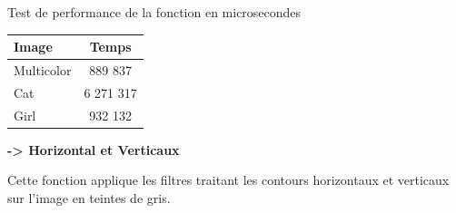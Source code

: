 \documentclass{article}
\begin{document}
\begin{center}
\medbreak
Test de performance de la fonction en microsecondes
\bigbreak
   \begin{tabular}{ | l | c | }
     \hline
     Image & Temps \\
     \hline
     Multicolor & 889 837 \\
     \hline
     Cat & 6 271 317 \\
     \hline
     Girl & 932 132 \\
     \hline
   \end{tabular}
 \end{center}
\bigbreak

\textbf{-> Horizontal et Verticaux}

Cette fonction applique les filtres traitant les contours horizontaux et verticaux sur l'image en teintes de gris.
\end{document}
